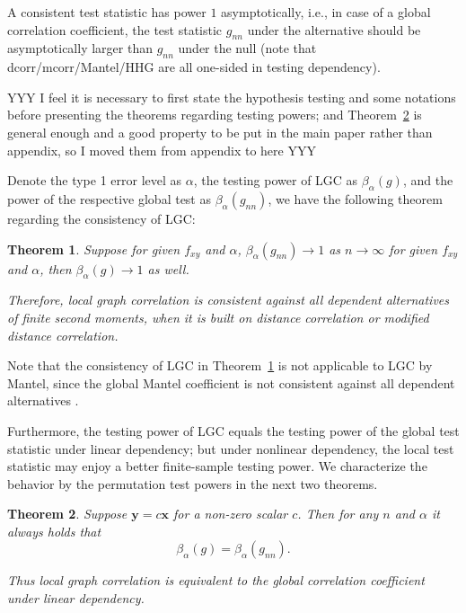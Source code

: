 \documentclass[11pt]{article}
\providecommand{\mb}[1]{\boldsymbol{#1}}
\newtheorem{thm}{Theorem}
\begin{document}
A consistent test statistic has power $1$ asymptotically, i.e., in case of a global correlation coefficient, the test statistic $g_{nn}$ under the alternative should be asymptotically larger than $g_{nn}$ under the null (note that dcorr/mcorr/Mantel/HHG are all one-sided in testing dependency).

YYY I feel it is necessary to first state the hypothesis testing and some notations before presenting the theorems regarding testing powers; and Theorem~\ref{thm2} is general enough and a good property to be put in the main paper rather than appendix, so I moved them from appendix to here YYY

Denote the type 1 error level as $\alpha$, the testing power of LGC as $\beta_{\alpha}(g)$, and the power of the respective global test as $\beta_{\alpha}(g_{nn})$, we have the following theorem regarding the consistency of LGC:
\begin{thm}
\label{thm1}
Suppose for given $f_{xy}$ and $\alpha$, $\beta_{\alpha}(g_{nn}) \rightarrow 1$ as $n \rightarrow \infty$ for given $f_{xy}$ and $\alpha$, then $\beta_{\alpha}(g) \rightarrow 1$ as well.

Therefore, local graph correlation is consistent against all dependent alternatives of finite second moments, when it is built on distance correlation or modified distance correlation.
\end{thm}

Note that the consistency of LGC in Theorem~\ref{thm1} is not applicable to LGC by Mantel, since the global Mantel coefficient is not consistent against all dependent alternatives \cite{JosseHolmes2013}. 

Furthermore, the testing power of LGC equals the testing power of the global test statistic under linear dependency; but under nonlinear dependency, the local test statistic may enjoy a better finite-sample testing power. We characterize the behavior by the permutation test powers in the next two theorems.

\begin{thm}
\label{thm2}
Suppose $\mb{y}=c\mb{x}$ for a non-zero scalar $c$. Then for any $n$ and $\alpha$ it always holds that
\begin{equation}
\beta_{\alpha}(g) = \beta_{\alpha}(g_{nn}).
\end{equation}

Thus local graph correlation is equivalent to the global correlation coefficient under linear dependency.
\end{thm}
\end{document}
